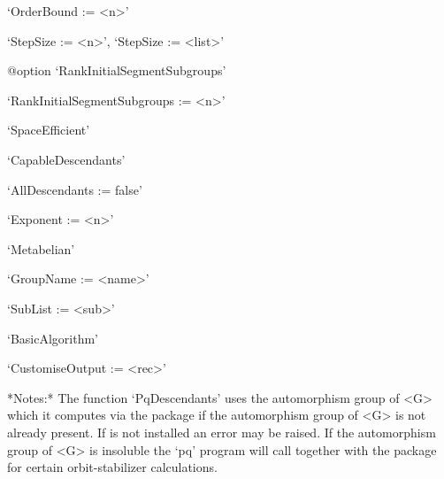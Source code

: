 \item{}`OrderBound := <n>'

\item{}`StepSize := <n>', `StepSize := <list>'

%
{@option \noexpand`RankInitialSegmentSubgroups'}
\item{}`RankInitialSegmentSubgroups := <n>'

\item{}`SpaceEfficient'

\item{}`CapableDescendants'

\item{}`AllDescendants := false'

\item{}`Exponent := <n>'

\item{}`Metabelian'

\item{}`GroupName := <name>'

\item{}`SubList := <sub>'

\item{}`BasicAlgorithm'

\item{}`CustomiseOutput := <rec>'

\endlist

*Notes:* The function `PqDescendants'  uses the automorphism group of <G>
which it computes via the package {\AutPGrp} if the automorphism group of
<G> is not already present.  If  {\AutPGrp} is not installed an error may
be  raised.  If  the  automorphism group  of  <G> is  insoluble the  `pq'
program will call {\GAP} together with the {\AutPGrp} package for certain
orbit-stabilizer calculations.

